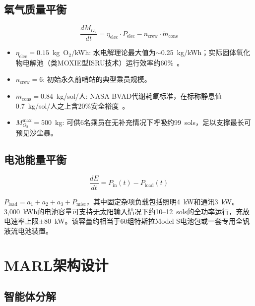\documentclass[11pt,a4paper]{ctexart}
\begin{document}
\subsection{氧气质量平衡}

\begin{equation}\label{eq:o2}
  \frac{dM_{O_2}}{dt} = \eta_{\text{elec}} \cdot P_{\text{elec}} - n_{\text{crew}} \cdot \dot{m}_{\text{cons}}
\end{equation}

\begin{itemize}
  \item $\eta_{\text{elec}} = 0.15$~kg~O$_2$/kWh: 水电解理论最大值为$\sim$0.25~kg/kWh；实际固体氧化物电解池（类MOXIE型ISRU技术）运行效率约60\%~\cite{mars_isru}。
  \item $n_{\text{crew}} = 6$: 初始永久前哨站的典型乘员规模。
  \item $\dot{m}_{\text{cons}} = 0.84$~kg/sol/人: NASA BVAD代谢耗氧标准，在标称静息值0.7~kg/sol/人之上含20\%安全裕度~\cite{nasa_ls}。
  \item $M_{O_2}^{\text{max}} = 500$~kg: 可供6名乘员在无补充情况下呼吸约99~sols，足以支撑最长可预见沙尘暴。
\end{itemize}

\subsection{电池能量平衡}

\begin{equation}\label{eq:battery}
  \frac{dE}{dt} = P_{\text{in}}(t) - P_{\text{load}}(t)
\end{equation}

$P_{\text{load}} = a_1 + a_2 + a_3 + P_{\text{misc}}$，其中固定杂项负载包括照明4~kW和通讯3~kW。3,000~kWh的电池容量可支持无太阳输入情况下约10--12~sols的全功率运行，充放电速率上限$\pm 80$~kW。该容量约相当于60组特斯拉Model S电池包或一套专用全钒液流电池装置。

\section{MARL架构设计}

\subsection{智能体分解}
\end{document}
